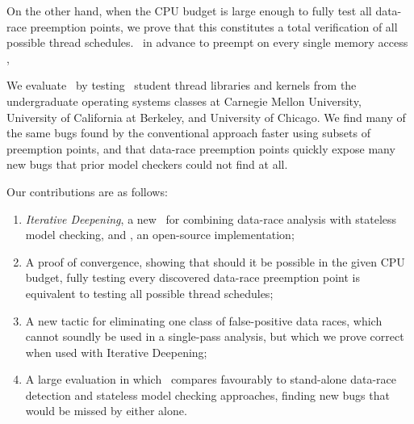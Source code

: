 
On the other hand, when the CPU budget is large enough to fully test all data-race preemption points,
we prove that this constitutes a total verification of all possible thread schedules.
~in advance to preempt on every single memory access \cite{spin}, 


We evaluate \quicksand~by testing \numstudence~student thread libraries and kernels from the undergraduate operating systems classes at Carnegie Mellon University, University of California at Berkeley, and University of Chicago.
We find many of the same bugs found by the conventional approach faster using subsets of preemption points,
and that data-race preemption points quickly expose many new bugs that prior model checkers could not find at all.

Our contributions are as follows:
\begin{enumerate}
	\item {\em Iterative Deepening}, a new ~for combining data-race analysis with stateless model checking, and \quicksand, an open-source implementation;
	\item A proof of convergence, showing that should it be possible in the given CPU budget,
		fully testing every discovered data-race preemption point is equivalent to testing all possible thread schedules;
	\item A new tactic for eliminating one class of false-positive data races,
		which cannot soundly be used in a single-pass analysis,
		but which we prove correct when used with Iterative Deepening;
	\item A large evaluation in which \quicksand~compares favourably to stand-alone data-race detection and stateless model checking approaches, finding new bugs that would be missed by either alone.
\end{enumerate}

